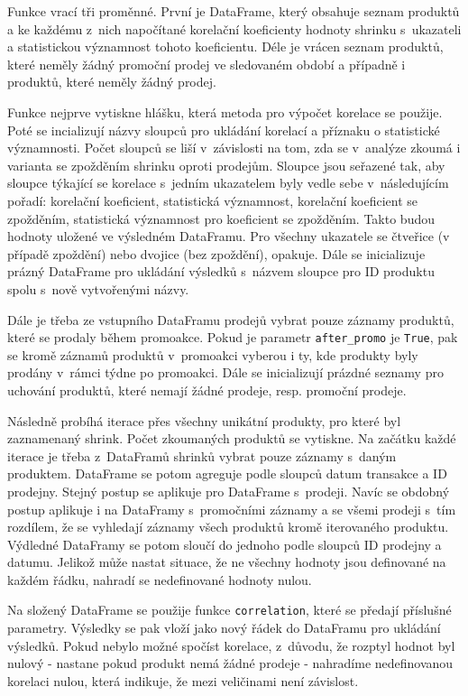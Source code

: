 Funkce vrací tři proměnné. První je DataFrame, který obsahuje seznam produktů a ke každému z~nich napočítané korelační koeficienty hodnoty shrinku s~ukazateli a statistickou významnost tohoto koeficientu. Déle je vrácen seznam produktů, které neměly žádný promoční prodej ve sledovaném období a případně i produktů, které neměly žádný prodej.

Funkce nejprve vytiskne hlášku, která metoda pro výpočet korelace se použije. Poté se incializují názvy sloupců pro ukládání korelací a příznaku o statistické významnosti. Počet sloupců se liší v~závislosti na tom, zda se v~analýze zkoumá i varianta se zpožděním shrinku oproti prodejům. Sloupce jsou seřazené tak, aby sloupce týkající se korelace s~jedním ukazatelem byly vedle sebe v~následujícím pořadí: korelační koeficient, statistická významnost, korelační koeficient se zpožděním, statistická významnost pro koeficient se zpožděním. Takto budou hodnoty uložené ve výsledném DataFramu. Pro všechny ukazatele se čtveřice (v případě zpoždění) nebo dvojice (bez zpoždění), opakuje. Dále se inicializuje prázný DataFrame pro ukládání výsledků s~názvem sloupce pro ID produktu spolu s~nově vytvořenými názvy. 

Dále je třeba ze vstupního DataFramu prodejů vybrat pouze záznamy produktů, které se prodaly během promoakce. Pokud je parametr \texttt{after\_promo} je \texttt{True}, pak se kromě záznamů produktů v~promoakci vyberou i ty, kde produkty byly prodány v~rámci týdne po promoakci. Dále se inicializují prázdné seznamy pro uchování produktů, které nemají žádné prodeje, resp. promoční prodeje.

Následně probíhá iterace přes všechny unikátní produkty, pro které byl zaznamenaný shrink. Počet zkoumaných produktů se vytiskne. Na začátku každé iterace je třeba z~DataFramů shrinků vybrat pouze záznamy s~daným produktem. DataFrame se potom agreguje podle sloupců datum transakce a ID prodejny. Stejný postup se aplikuje pro DataFrame s~prodeji. Navíc se obdobný postup aplikuje i na DataFramy s~promočními záznamy a se všemi prodeji s~tím rozdílem, že se vyhledají záznamy všech produktů kromě iterovaného produktu. Výdledné DataFramy se potom sloučí do jednoho podle sloupců ID prodejny a datumu. Jelikož může nastat situace, že ne všechny hodnoty jsou definované na každém řádku, nahradí se nedefinované hodnoty nulou.

Na složený DataFrame se použije funkce \texttt{correlation}, které se předají příslušné parametry. Výsledky se pak vloží jako nový řádek do DataFramu pro ukládání výsledků. Pokud nebylo možné spočíst korelace, z~důvodu, že rozptyl hodnot byl nulový - nastane pokud produkt nemá žádné prodeje -  nahradíme nedefinovanou korelaci nulou, která indikuje, že mezi veličinami není závislost.

